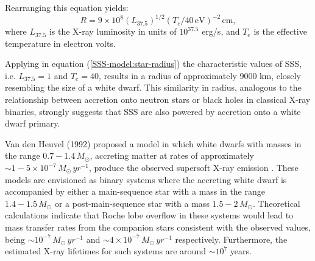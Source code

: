         	Rearranging this equation yields:
        	\begin{equation} \label{SSS-model:star-radius}
        		R=9\times 10^8(L_{37.5})^{1/2}(T_e/40\,\mathrm{eV})^{-2}\,\mathrm{cm,}
        	\end{equation}
        	where $L_{37.5}$ is the X-ray luminosity in units of $10^{37.5}$ erg/s, and $T_e$ is the effective temperature in electron volts.
        	
        	Applying in equation (\ref{SSS-model:star-radius}) the characteristic values of SSS, i.e. $L_{37.5}=1$ and $T_e=40$, results in a radius of approximately 9000 km, closely resembling the size of a white dwarf. This similarity in radius, analogous to the relationship between accretion onto neutron stars or black holes in classical X-ray binaries, strongly suggests that SSS are also powered by accretion onto a white dwarf primary.
        	
        	Van den Heuvel (1992) proposed a model in which white dwarfs with masses in the range $0.7-1.4\,M_{\odot}$, accreting matter at rates of approximately $\sim 1-5\times 10^{-7}\,M_{\odot}\,yr^{-1}$, produce the observed supersoft X-ray emission \cite{van1992accreting}. These models are envisioned as binary systems where the accreting white dwarf is accompanied by either a main-sequence star with a mass in the range $1.4-1.5\,M_{\odot}$ or a post-main-sequence star with a mass $1.5-2\,M_{\odot}$. Theoretical calculations indicate that Roche lobe overflow in these systems would lead to mass transfer rates from the companion stars consistent with the observed values, being $\sim 10^{-7}\,M_{\odot}\,yr^{-1}$ and $\sim 4 \times 10^{-7}\,M_{\odot}\,yr^{-1}$ respectively. Furthermore, the estimated X-ray lifetimes for such systems are around $\sim 10^{7}$ years.
        	
